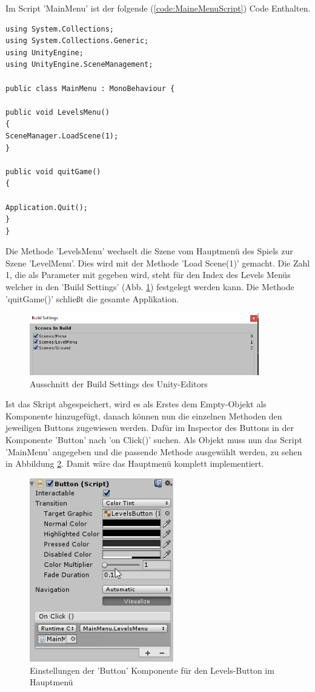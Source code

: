 Im Script 'MainMenu' ist der folgende (\cref{code:MaineMenuScript}) Code Enthalten.

\begin{lstlisting}[language={[Sharp]C}, caption=MainMenu-Script, label=code:MaineMenuScript]
using System.Collections;
using System.Collections.Generic;
using UnityEngine;
using UnityEngine.SceneManagement;

public class MainMenu : MonoBehaviour {

public void LevelsMenu()
{
SceneManager.LoadScene(1);
}

public void quitGame()
{

Application.Quit();
}
}

\end{lstlisting}
Die Methode ’LevelsMenu’ wechselt die Szene vom Hauptmenü des Spiels zur Szene ’LevelMenu’. Dies wird mit der Methode ’Load Scene(1)’ gemacht. Die Zahl 1, die als Parameter mit gegeben wird, steht für den Index des Levels Menüs welcher in den ’Build Settings’ (Abb. \ref{BuildSettings}) festgelegt werden kann. Die Methode ’quitGame()’ schließt die gesamte Applikation.
\begin{figure}[H]
	\includegraphics[width=10cm]{images/BuildSettings.png}
	\caption{Ausschnitt der Build Settings des Unity-Editors}
	\label{BuildSettings}
\end{figure}
Ist das Skript abgespeichert, wird es als Erstes dem Empty-Objekt als Komponente hinzugefügt, danach können nun die einzelnen Methoden den jeweiligen Buttons zugewiesen werden. Dafür im Inspector des Buttons in der Komponente ’Button’ nach ’on Click()’ suchen. Als Objekt muss nun das Script ’MainMenu’ angegeben und die passende Methode ausgewählt werden, zu sehen in Abbildung \ref{onClick}. Damit wäre das Hauptmenü komplett implementiert.
\begin{figure}[H]
	\includegraphics[height=8cm]{images/ButtonScriptLevelsButton.png}
	\caption{Einstellungen der 'Button' Komponente für den Levels-Button im Hauptmenü}
	\label{onClick}
\end{figure}
